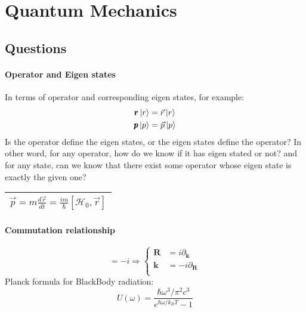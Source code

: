 \chapter{Quantum Mechanics}

\section{Questions}
\subsubsection{Operator and Eigen states}
In terms of operator and corresponding eigen states, for example:
\begin{equation}
    \begin{gathered}
	\pmb{r}\ket{r} = \vec{r}\ket{r}   \\
	\pmb{p}\ket{p} = \vec{p}\ket{p}
    \end{gathered}
\end{equation}
Is the operator define the eigen states, or the eigen states define the operator? In other word, for any operator, how do we know if it has eigen stated or not? and for any state, can we know that there exist some operator whose eigen state is exactly the given one?


\renewcommand{\arraystretch}{2}
\begin{table}[h]
    \begin{center}
    \begin{tabular}{c}
	\hline
	$\displaystyle \vec{p} = m\frac{d\vec{r}}{dt} = \frac{im}{\hbar}[\mathcal{H}_0, \vec{r}]$   \\
	\hline
    \end{tabular}
    \end{center}
\end{table}
\renewcommand{\arraystretch}{1}


\subsubsection{Commutation relationship}
\begin{equation}
    [ \pmb{k}, \pmb{R} ]  = -i \Longrightarrow \left\{
	\begin{aligned}
	    \pmb{R} &= i\partial_{\pmb{k}}	\\
	    \pmb{k} &= -i\partial_{\pmb{R}}	\\
	\end{aligned}
    \right.
\end{equation}
Planck formula for BlackBody radiation:
\[
    U(\omega) = \frac{\hbar \omega^3 / \pi^2c^3}{e^{\hbar\omega/k_B T} - 1}
\]
